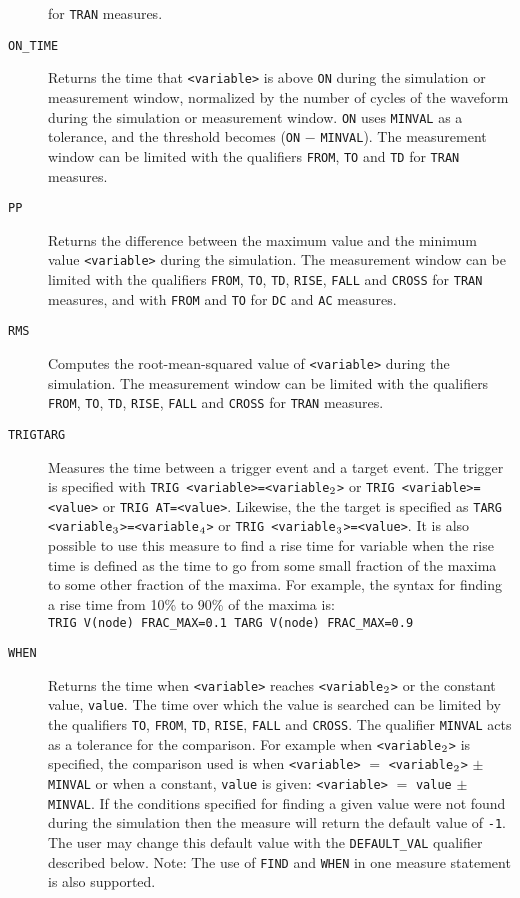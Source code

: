 \begin{Command}
\begin{Arguments}
\begin{description}
    for {\tt TRAN} measures.
  \item[\tt ON\_TIME] Returns the time that {\tt <variable>} is above {\tt ON} during the
    simulation or measurement window, normalized by the number of cycles of the waveform 
    during the simulation or measurement window.  {\tt ON} uses {\tt MINVAL} as a tolerance, 
    and the threshold becomes ({\tt ON} $-$ {\tt MINVAL}).  The measurement window can be limited
    with the qualifiers {\tt FROM}, {\tt TO} and {\tt TD} for {\tt TRAN} measures.
  \item[\tt PP] Returns the difference between the maximum value and the minimum value
    {\tt <variable>} during the simulation. The measurement window can be limited with 
    the qualifiers {\tt FROM}, {\tt TO}, {\tt TD}, {\tt RISE}, {\tt FALL} and {\tt CROSS}
    for {\tt TRAN} measures, and with {\tt FROM} and {\tt TO} for {\tt DC} and {\tt AC} measures. 
  \item[\tt RMS] Computes the root-mean-squared value of {\tt <variable>} during the
    simulation.  The measurement window can be limited with the qualifiers {\tt FROM}, 
    {\tt TO}, {\tt TD}, {\tt RISE}, {\tt FALL} and {\tt CROSS} for {\tt TRAN} measures. 
  \item[\vbox{\hbox{\tt TRIG\hfil}\hbox{\tt TARG\hfil}}] Measures the
    time between a trigger event and a target event.  The trigger is
    specified with {\tt TRIG <variable>=<variable\(\sb{2}\)>} or 
    {\tt TRIG <variable>=<value>} or {\tt TRIG AT=<value>}.  Likewise, the the 
    target is specified as {\tt TARG <variable\(\sb{3}\)>=<variable\(\sb{4}\)>} or 
    {\tt TRIG <variable\(\sb{3}\)>=<value>}.  It is also possible to use
    this measure to find a rise time for variable when the rise time is
    defined as the time to go from some small fraction of the maxima to
    some other fraction of the maxima.  For example, the syntax for finding
    a rise time from 10\% to 90\% of the maxima is:\\
    \texttt{TRIG V(node) FRAC\_MAX=0.1 TARG V(node) FRAC\_MAX=0.9}
  \item[\tt WHEN] Returns the time when {\tt <variable>} reaches {\tt <variable\(\sb{2}\)>} or
    the constant value, {\tt value}.  The time over which the value is searched
    can be limited by the qualifiers {\tt TO}, {\tt FROM}, {\tt TD}, {\tt RISE}, {\tt FALL} and {\tt CROSS}.
    The qualifier {\tt MINVAL} acts as a tolerance for the comparison.  
    For example when {\tt <variable\(\sb{2}\)>} is
    specified, the comparison used is when {\tt <variable>} $=$ {\tt <variable\(\sb{2}\)>} $\pm$ {\tt MINVAL}
    or when a constant, {\tt value} is given: {\tt <variable>} $=$ {\tt value} $\pm$ {\tt MINVAL}.
    If the conditions specified for finding a given value were not found during the simulation then
    the measure will return the default value of {\tt -1}.  The user may change this default value with
    the {\tt DEFAULT\_VAL} qualifier described below.  Note: The use of {\tt FIND} and {\tt WHEN} 
    in one measure statement is also supported.
\end{description}


\end{Arguments}
\end{Command}
